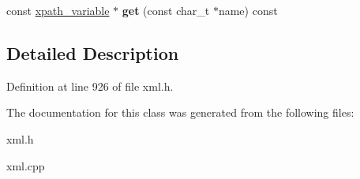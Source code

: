 \begin{DoxyCompactItemize}
\item 
\hypertarget{classphys_1_1xml_1_1xpath__variable__set_a719e167cebc050d4baa11925f3302380}{
const \hyperlink{classphys_1_1xml_1_1xpath__variable}{xpath\_\-variable} $\ast$ {\bfseries get} (const char\_\-t $\ast$name) const }
\label{d8/d65/classphys_1_1xml_1_1xpath__variable__set_a719e167cebc050d4baa11925f3302380}

\end{DoxyCompactItemize}


\subsection{Detailed Description}


Definition at line 926 of file xml.h.



The documentation for this class was generated from the following files:\begin{DoxyCompactItemize}
\item 
xml.h\item 
xml.cpp\end{DoxyCompactItemize}
